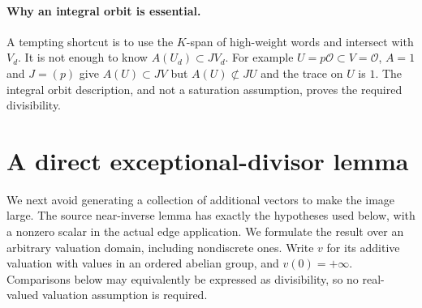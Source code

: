 \documentclass[11pt]{article}
\newcommand{\OO}{\mathcal O}
\begin{document}
\paragraph{Why an integral orbit is essential.} A tempting shortcut is to use the $K$-span of high-weight words and intersect with $V_d$. It is not enough to know $A(U_d)\subset J V_d$. For example $U=p\OO\subset V=\OO$, $A=1$ and $J=(p)$ give $A(U)\subset JV$ but $A(U)\not\subset JU$ and the trace on $U$ is $1$. The integral orbit description, and not a saturation assumption, proves the required divisibility.

\section{A direct exceptional-divisor lemma}\label{sec:rank}
We next avoid generating a collection of additional vectors to make the image large. The source near-inverse lemma has exactly the hypotheses used below, with a nonzero scalar in the actual edge application. We formulate the result over an arbitrary valuation domain, including nondiscrete ones. Write $v$ for its additive valuation with values in an ordered abelian group, and $v(0)=+\infty$. Comparisons below may equivalently be expressed as divisibility, so no real-valued valuation assumption is required.
\end{document}
